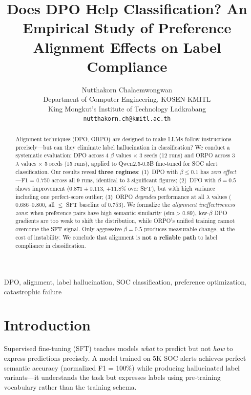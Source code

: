 \documentclass[journal]{IEEEtran}
\begin{document}
\title{Does DPO Help Classification? An Empirical Study of Preference Alignment Effects on Label Compliance}
\author{Nutthakorn Chalaemwongwan \\ Department of Computer Engineering, KOSEN-KMITL \\ King Mongkut's Institute of Technology Ladkrabang \\ \texttt{nutthakorn.ch@kmitl.ac.th}}
\maketitle

\begin{abstract}
Alignment techniques (DPO, ORPO) are designed to make LLMs follow instructions precisely---but can they eliminate label hallucination in classification? We conduct a systematic evaluation: DPO across 4 $\beta$ values $\times$ 3 seeds (12 runs) and ORPO across 3 $\lambda$ values $\times$ 5 seeds (15 runs), applied to Qwen2.5-0.5B fine-tuned for SOC alert classification. Our results reveal \textbf{three regimes}: (1)~DPO with $\beta \leq 0.1$ has \emph{zero effect}---F1 = 0.750 across all 9 runs, identical to 3 significant figures; (2)~DPO with $\beta = 0.5$ shows improvement ($0.871 \pm 0.113$, $+11.8\%$ over SFT), but with high variance including one perfect-score outlier; (3)~ORPO \emph{degrades} performance at all $\lambda$ values ($0.686$--$0.800$, all $\leq$ SFT baseline of $0.753$). We formalize the \emph{alignment ineffectiveness zone}: when preference pairs have high semantic similarity ($\text{sim} > 0.89$), low-$\beta$ DPO gradients are too weak to shift the distribution, while ORPO's unified training cannot overcome the SFT signal. Only aggressive $\beta = 0.5$ produces measurable change, at the cost of instability. We conclude that alignment is \textbf{not a reliable path} to label compliance in classification.
\end{abstract}
DPO, alignment, label hallucination, SOC classification, preference optimization, catastrophic failure


\section{Introduction}
Supervised fine-tuning (SFT) teaches models \emph{what} to predict but not \emph{how} to express predictions precisely. A model trained on 5K SOC alerts achieves perfect semantic accuracy (normalized F1 = 100\%) while producing hallucinated label variants---it understands the task but expresses labels using pre-training vocabulary rather than the training schema.
\end{document}
